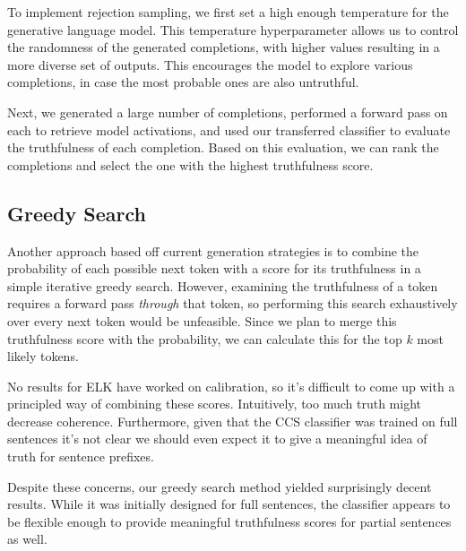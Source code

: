 \documentclass{article}
\begin{document}
To implement rejection sampling, we first set a high enough temperature for the generative language model. This temperature hyperparameter allows us to control the randomness of the generated completions, with higher values resulting in a more diverse set of outputs. This encourages the model to explore various completions, in case the most probable ones are also untruthful. 

Next, we generated a large number of completions, performed a forward pass on each to retrieve model activations, and used our transferred classifier to evaluate the truthfulness of each completion. Based on this evaluation, we can rank the completions and select the one with the highest truthfulness score.



\subsection{Greedy Search}




Another approach based off current generation strategies is to combine the probability of each possible next token with a score for its truthfulness in a simple iterative greedy search. However, examining the truthfulness of a token requires a forward pass {\em through} that token, so performing this search exhaustively over every next token would be unfeasible. Since we plan to merge this truthfulness score with the probability, we can calculate this for the top $k$ most likely tokens.

No results for ELK have worked on calibration, so it's difficult to come up with a principled way of combining these scores. Intuitively, too much truth might decrease coherence. Furthermore, given that the CCS classifier was trained on full sentences it's not clear we should even expect it to give a meaningful idea of truth for sentence prefixes.


Despite these concerns, our greedy search method yielded surprisingly decent results. While it was initially designed for full sentences, the classifier appears to be flexible enough to provide meaningful truthfulness scores for partial sentences as well. 
\end{document}
